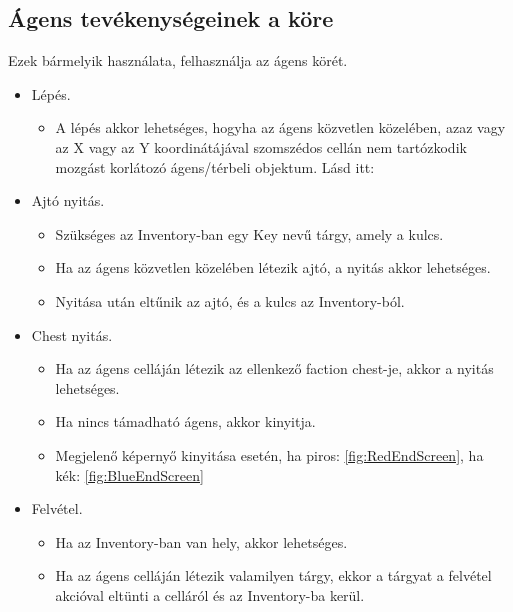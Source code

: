 \subsection{Ágens tevékenységeinek a köre}

\noindent Ezek bármelyik használata, felhasználja az ágens körét.

\begin{itemize}

    \item Lépés. 
    
    \begin{itemize}
        \item A lépés akkor lehetséges, hogyha az ágens közvetlen közelében, azaz vagy az X vagy az Y koordinátájával szomszédos cellán nem tartózkodik mozgást korlátozó ágens/térbeli objektum. Lásd itt: 
    \end{itemize}

    \item Ajtó nyitás. 
    
    \begin{itemize}
        \item Szükséges az Inventory-ban egy Key nevű tárgy, amely a kulcs.
        \item Ha az ágens közvetlen közelében létezik ajtó, a nyitás akkor lehetséges.
        \item Nyitása után eltűnik az ajtó, és a kulcs az Inventory-ból.
    \end{itemize}

    \item Chest nyitás. 
    
    \begin{itemize}
        \item Ha az ágens celláján létezik az ellenkező faction chest-je, akkor a nyitás lehetséges.
        \item Ha nincs támadható ágens, akkor kinyitja.
        \item Megjelenő képernyő kinyitása esetén, ha piros: \ref{fig:RedEndScreen}, ha kék: \ref{fig:BlueEndScreen}
    \end{itemize}

    \item Felvétel. 
    
    \begin{itemize}
        \item Ha az Inventory-ban van hely, akkor lehetséges.
        \item Ha az ágens celláján létezik valamilyen tárgy, ekkor a tárgyat a felvétel akcióval eltünti a celláról és az Inventory-ba kerül.
    \end{itemize}


\end{itemize}
